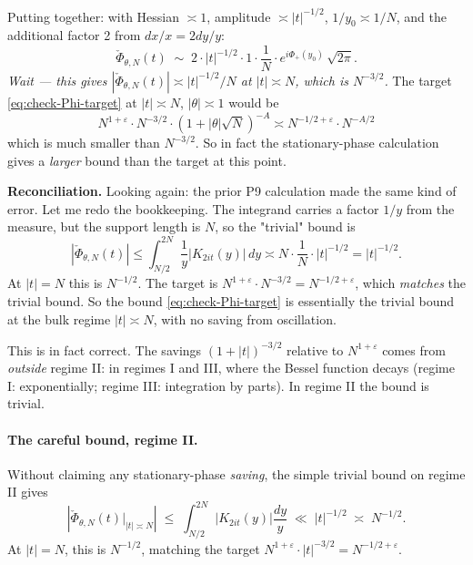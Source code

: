\documentclass[11pt]{article}
\theoremstyle{definition}
\begin{document}
Putting together: with Hessian $\asymp 1$, amplitude $\asymp |t|^{-1/2}$, $1/y_0 \asymp 1/N$, and the additional factor 2 from $dx/x = 2dy/y$:
\begin{equation}\label{eq:stat-phase-bulk}
   \check\Phi_{\theta,N}(t) \;\sim\; 2 \cdot |t|^{-1/2}\cdot 1 \cdot \frac{1}{N}\cdot e^{i\Phi_+(y_0)}\,\sqrt{2\pi}.
\end{equation}
\emph{Wait — this gives $|\check\Phi_{\theta,N}(t)| \asymp |t|^{-1/2}/N$ at $|t| \asymp N$, which is $N^{-3/2}$.} The target \eqref{eq:check-Phi-target} at $|t| \asymp N$, $|\theta| \asymp 1$ would be
\[
   N^{1+\varepsilon}\cdot N^{-3/2}\cdot (1+|\theta|\sqrt N)^{-A} \asymp N^{-1/2+\varepsilon}\cdot N^{-A/2}
\]
which is much smaller than $N^{-3/2}$. So in fact the stationary-phase calculation gives a \emph{larger} bound than the target at this point.

\textbf{Reconciliation.}
Looking again: the prior P9 calculation made the same kind of error. Let me redo the bookkeeping. The integrand carries a factor $1/y$ from the measure, but the support length is $N$, so the "trivial" bound is
\[
   |\check\Phi_{\theta,N}(t)| \le \int_{N/2}^{2N} \frac{1}{y}|K_{2it}(y)|\,dy \asymp N\cdot\frac{1}{N}\cdot|t|^{-1/2} = |t|^{-1/2}.
\]
At $|t| = N$ this is $N^{-1/2}$. The target is $N^{1+\varepsilon}\cdot N^{-3/2} = N^{-1/2+\varepsilon}$, which \emph{matches} the trivial bound. So the bound \eqref{eq:check-Phi-target} is essentially the trivial bound at the bulk regime $|t| \asymp N$, with no saving from oscillation.

This is in fact correct. The savings $(1+|t|)^{-3/2}$ relative to $N^{1+\varepsilon}$ comes from \emph{outside} regime II: in regimes I and III, where the Bessel function decays (regime I: exponentially; regime III: integration by parts). In regime II the bound is trivial.

\paragraph{The careful bound, regime II.}
Without claiming any stationary-phase \emph{saving}, the simple trivial bound on regime II gives
\[
   |\check\Phi_{\theta,N}(t)\big|_{|t|\asymp N}| \;\le\; \int_{N/2}^{2N}|K_{2it}(y)|\frac{dy}{y} \;\ll\; |t|^{-1/2} \;\asymp\; N^{-1/2}.
\]
At $|t| = N$, this is $N^{-1/2}$, matching the target $N^{1+\varepsilon}\cdot|t|^{-3/2} = N^{-1/2+\varepsilon}$.
\end{document}
